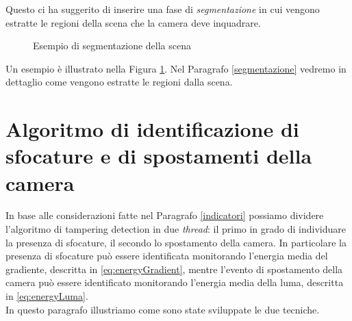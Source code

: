 Questo ci ha suggerito di inserire una fase di \textit{segmentazione} in cui vengono estratte le regioni della scena che la camera deve inquadrare.
 \begin{figure}[tb]
 	\centering
 	\caption{Esempio di segmentazione della scena}
 	\label{fig:testiSEGMENTAZIONE}
 \end{figure}
Un esempio \`e illustrato nella Figura \ref{fig:testiSEGMENTAZIONE}. 
Nel Paragrafo \ref{segmentazione} vedremo in dettaglio come vengono estratte le regioni dalla scena.
\section{Algoritmo di identificazione di sfocature e di spostamenti della camera}
\label{monitoraggio}
In base alle considerazioni fatte nel Paragrafo \ref{indicatori} possiamo dividere l'algoritmo di tampering detection in due \textit{thread}:
il primo in grado di individuare la presenza di sfocature, il secondo lo spostamento della camera.
In particolare la presenza di sfocature pu\`o essere identificata monitorando l'energia media del gradiente, descritta in \eqref{eq:energyGradient}, mentre l'evento di spostamento della camera pu\`o essere identificato monitorando l'energia media della luma, descritta in \eqref{eq:energyLuma}.\\
In questo paragrafo illustriamo come sono state sviluppate le due tecniche.
